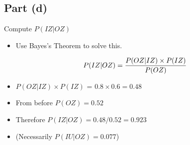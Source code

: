 \documentclass[a4paper,12pt]{article}
\begin{document}

\subsection*{Part (d)}
Compute $P(IZ|OZ)$ 
\begin{itemize}
\item Use Bayes's Theorem to solve this.

\[P(IZ|OZ) = {P(OZ|IZ)\times P(IZ)\over P(OZ)} \]

\item $P(OZ|IZ)\times P(IZ)$ = $0.8 \times 0.6 = 0.48$

\item From before $P(OZ) = 0.52$

\item Therefore $P(IZ|OZ) = 0.48 / 0.52 = \boldsymbol{0.923}$

\item (Necessarily $P(IU|OZ)  = 0.077$)
\end{itemize}
\end{document}
